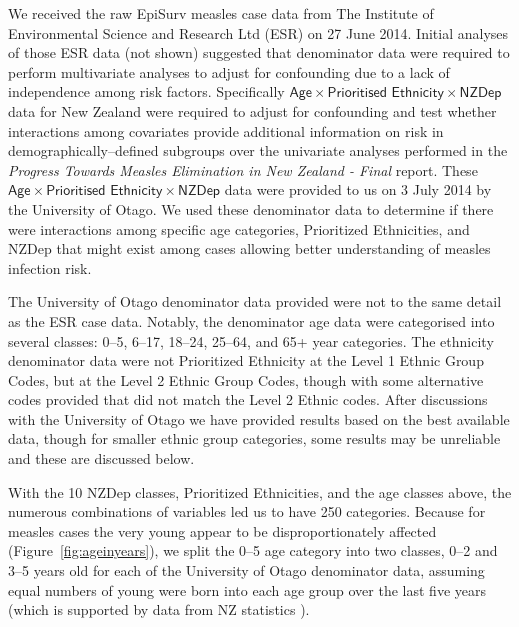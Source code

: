 \documentclass{article}
\begin{document}
We received the raw EpiSurv measles case data from The Institute of Environmental Science and Research Ltd (ESR) on 27 June 2014. Initial analyses of those ESR data (not shown) suggested that denominator data were required to perform multivariate analyses to adjust for confounding due to a lack of independence among risk factors. Specifically $\textsf{Age} \times \textsf{Prioritised Ethnicity} \times \textsf{NZDep}$ data for New Zealand were required to adjust for confounding and test whether interactions among covariates provide additional information on risk in demographically--defined subgroups over the univariate analyses performed in the \emph{Progress Towards Measles Elimination in New Zealand - Final} report. These $\textsf{Age} \times \textsf{Prioritised Ethnicity} \times \textsf{NZDep}$ data were provided to us on 3 July 2014 by the University of Otago. We used these denominator data to determine if there were interactions among specific age categories, Prioritized Ethnicities, and NZDep that might exist among cases allowing better understanding of measles infection risk.

The University of Otago denominator data provided were not to the same detail as the ESR case data. Notably, the denominator age data were categorised into several classes: 0--5, 6--17, 18--24, 25--64, and 65+ year categories. The ethnicity denominator data were not Prioritized Ethnicity at the Level 1 Ethnic Group Codes, but at the Level 2 Ethnic Group Codes, though with some alternative codes provided that did not match the Level 2 Ethnic codes. After discussions with the University of Otago we have provided results based on the best available data, though for smaller ethnic group categories, some results may be unreliable and these are discussed below.

With the 10 NZDep classes, Prioritized Ethnicities, and the age classes above, the numerous combinations of variables led us to have 250 categories. Because for measles cases the very young appear to be disproportionately affected (Figure~\ref{fig:ageinyears}), we split the 0--5 age category into two classes, 0--2 and 3--5 years old for each of the University of Otago denominator data, assuming equal numbers of young were born into each age group over the last five years (which is supported by data from NZ statistics \citep{stats14}).
\end{document}
